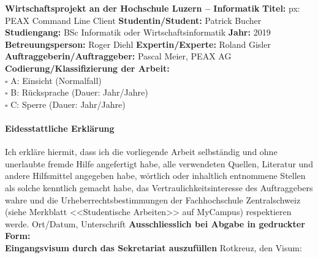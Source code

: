 \documentclass[11pt]{scrartcl}
\begin{document}
\noindent
\fontsize{12}{14}
\textbf{Wirtschaftsprojekt an der Hochschule Luzern -- Informatik} \newline \newline
\fontsize{11}{13}
\noindent
\textbf{Titel:} px: PEAX Command Line Client \newline \newline
\noindent
\textbf{Studentin/Student:} Patrick Bucher \newline \newline
\textbf{Studiengang:} BSc Informatik oder Wirtschaftsinformatik  \newline \newline
\textbf{Jahr:} 2019 \newline \newline
\textbf{Betreuungsperson:} Roger Diehl \newline \newline
\textbf{Expertin/Experte:} Roland Gisler \newline \newline
\textbf{Auftraggeberin/Auftraggeber:} Pascal Meier, PEAX AG \newline \newline \newline
\textbf{Codierung/Klassifizierung der Arbeit:} \\
$\square$ A: Einsicht 	(Normalfall) \\
$\square$ B: Rücksprache (Dauer: \underline{\hspace*{1cm}} Jahr/Jahre)\\
$\square$ C: Sperre	(Dauer: \underline{\hspace*{1cm}} Jahr/Jahre)\\
\paragraph{\textbf{Eidesstattliche Erklärung}}
Ich erkläre hiermit, dass ich die vorliegende Arbeit selbständig und ohne unerlaubte fremde Hilfe angefertigt habe, alle verwendeten Quellen, Literatur und andere Hilfsmittel angegeben habe, wörtlich oder inhaltlich entnommene Stellen als solche kenntlich gemacht habe, das Vertraulichkeitsinteresse des Auftraggebers wahre und die Urheberrechtsbestimmungen der Fachhochschule Zentralschweiz (siehe Merkblatt <<Studentische Arbeiten>> auf MyCampus) respektieren werde. \newline \newline
Ort/Datum, Unterschrift \underline{\hspace*{8cm}} \newline \newline \newline
\textbf{Ausschliesslich bei Abgabe in gedruckter Form: \\
Eingangsvisum durch das Sekretariat auszufüllen}\newline \newline
Rotkreuz, den \underline{\hspace*{4cm}}	\hspace*{1cm} Visum: \underline{\hspace*{4cm}}
\end{document}
